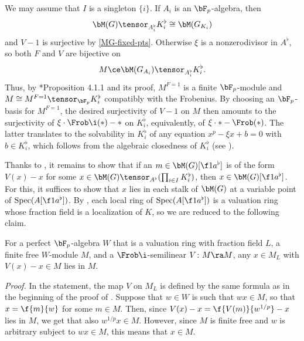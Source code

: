 \bpf
We may assume that $I$ is a singleton $\{ i \}$. If $A_i$ is an $\bF_p$-algebra, then
\[
\bM(G) \tensor_{A_i^\flat} K_i^\flat \cong \bM(G_{K_i})
\]
and $V - 1$ is surjective by \eqref{MG-fixed-pts}. %
Otherwise $\xi$ is a nonzerodivisor in $A^\flat$, so both $F$ and $V$ are bijective on
\[
M \ce \bM(G_{A_i}) \tensor_{A_i^\flat} K_i^\flat.
\]
Thus, by \cite{Kat73}*{Proposition 4.1.1 and its proof}, $M^{F = 1}$ is a finite $\bF_p$-module and $M \cong M^{F = 1} \tensor_{\bF_p} K_i^\flat$ compatibly with the Frobenius. By choosing an $\bF_p$-basis for $M^{F = 1}$, the desired surjectivity of $V - 1$ on $M$ then amounts to the surjectivity of $\xi \cdot \Frob\i(*) - *$ on $K_i^\flat$, equivalently, of $\xi \cdot * - \Frob(*)$. The latter translates to the solvability in $K_i^\flat$ of any equation $x^p - \xi x + b = 0$  with $b \in K_i^\flat$, which follows from the algebraic closedness of $K_i^\flat$ (see ).%
\epf


Thanks to ,
it remains to show that if an $m \in \bM(G)[\f 1{a^\flat}]$ is of the form $V(x) - x$ for some $x \in \bM(G) \tensor_{A^\flat} (\prod_{i \in I} K_i^\flat)$, then $x \in \bM(G)[\f 1{a^\flat}]$. For this, it suffices to show that $x$ lies in each stalk of $\bM(G)$ at a variable point of $\Spec(A[\f 1{a^\flat}])$. %
By , each local ring of $\Spec(A[\f 1{a^\flat}])$ is a valuation ring whose fraction field is a localization of $K$, so we are reduced to the following claim.

\bcl
For a perfect $\bF_p$-algebra $W$ that is a valuation ring with fraction field $L$, a finite free $W$-module $M$, and a $\Frob\i$-semilinear $V \colon M \ra M$, any $x \in M_L$ with $V(x) - x \in M$ lies in $M$.
\ecl

\emph{Proof. }
In the statement, the map $V$ on $M_L$ is defined by the same formula as in the beginning of the proof of . Suppose that $w \in W$ is such that $wx \in M$, so that $x = \f{m}{w}$ for some $m \in M$. Then, since $V(x) - x = \f{V(m)}{w^{1/p}} - x$ lies in $M$, we get that also $w^{1/p}x \in M$. However, since $M$ is finite free and $w$ is arbitrary subject to $wx \in M$, this means that $x \in M$.
\QEDD
















